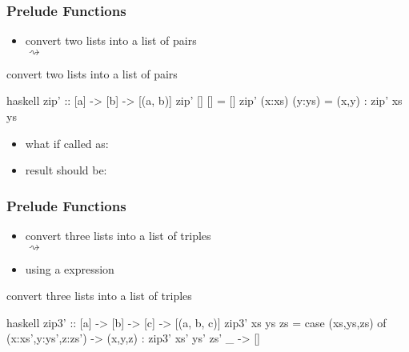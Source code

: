 \documentclass[dvipsnames]{beamer}
\theoremstyle{plain}
\begin{document}
\begin{frame}[fragile]
  \frametitle{Prelude Functions}

  \begin{itemize}
    \item convert two lists into a list of pairs\\
       $\rightsquigarrow$
  \end{itemize}

  \begin{exampleblock}{convert two lists into a list of pairs}
    \begin{pygments}{haskell}
zip' :: [a] -> [b] -> [(a, b)]
zip' [] [] = []
zip' (x:xs) (y:ys) = (x,y) : zip' xs ys
    \end{pygments}
  \end{exampleblock}

  \pause
  \begin{itemize}
    \item what if called as:\\
    \item result should be: 
  \end{itemize}
\end{frame}

\begin{frame}[fragile]
  \frametitle{Prelude Functions}

  \begin{itemize}
    \item convert three lists into a list of triples\\
       $\rightsquigarrow$
    \item using a  expression
  \end{itemize}

  \pause
  \begin{exampleblock}{convert three lists into a list of triples}
    \begin{pygments}{haskell}
zip3' :: [a] -> [b] -> [c] -> [(a, b, c)]
zip3' xs ys zs =
    case (xs,ys,zs) of
      (x:xs',y:ys',z:zs') ->
          (x,y,z) : zip3' xs' ys' zs'
      _ -> []
    \end{pygments}
  \end{exampleblock}
\end{frame}
\end{document}
